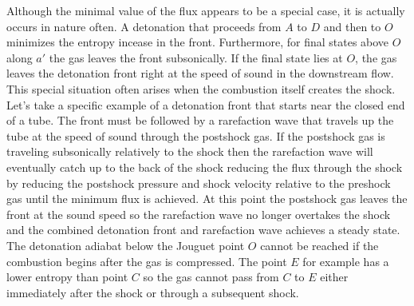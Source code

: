 Although the minimal value of the flux appears to be a special case,
it is actually occurs in nature often.  A detonation that proceeds
from $A$ to $D$ and then to $O$ minimizes the entropy incease in the
front. Furthermore, for final states above $O$ along $a'$ the gas
leaves the front subsonically.  If the final state lies at $O$, the
gas leaves the detonation front right at the speed of sound in the
downstream flow.  This special situation often arises when the
combustion itself creates the shock.  Let's take a specific example of
a detonation front that starts near the closed end of a tube.  The
front must be followed by a rarefaction wave that travels up the tube
at the speed of sound through the postshock gas.  If the postshock gas
is traveling subsonically relatively to the shock then the rarefaction
wave will eventually catch up to the back of the shock reducing the
flux through the shock by reducing the postshock pressure and shock
velocity relative to the preshock gas until the minimum flux is
achieved.  At this point the postshock gas leaves the front at the
sound speed so the rarefaction wave no longer overtakes the shock and
the combined detonation front and rarefaction wave achieves a steady
state.  The detonation adiabat below the Jouguet point $O$ cannot be
reached if the combustion begins after the gas is compressed.  The
point $E$ for example has a lower entropy than point $C$ so the gas
cannot pass from $C$ to $E$ either immediately after the shock or
through a subsequent shock.



